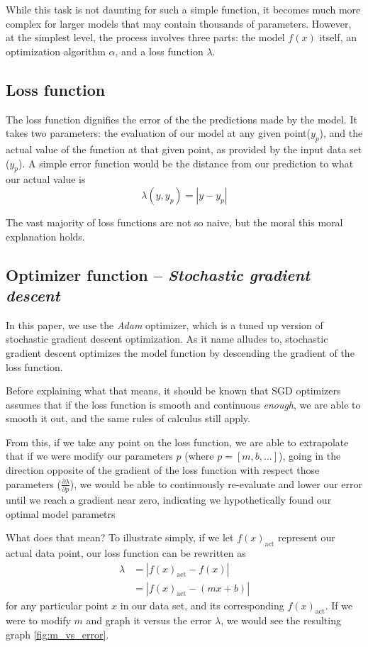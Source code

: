 \documentclass[titlepage,letterpaper]{article}
\begin{document}
While this task is not daunting for such a simple function, it becomes much more complex for larger models that may contain thousands of parameters. However, at the simplest level, the process involves three parts: the model $f(x)$ itself, an optimization algorithm $\alpha$,  and a loss function $\lambda$.


\subsection{Loss function}

The loss function dignifies the error of the the predictions made by the model. It takes two parameters: the evaluation of our model at any given point($y_p$), and the actual value of the function at that given point, as provided by the input data set ($y_p$). A simple error function would be the distance from our prediction to what our actual value is
\[\lambda(y,y_p) =  |y - y_p| \]

The vast majority of loss functions are not so naive, but the moral this moral explanation holds.


\subsection{Optimizer function -- \textit{Stochastic gradient descent}}

In this paper, we use the \textit{Adam} optimizer, which is a tuned up version of stochastic gradient descent optimization. As it name alludes to, stochastic gradient descent optimizes the model function by descending the gradient of the loss function. 

Before explaining what that means, it should be known that SGD optimizers assumes  that if the loss function is smooth and continuous \textit{enough}, we are able to smooth it out, and the same rules of calculus still apply.

From this, if we take any point on the loss function, we are able to extrapolate that if we were modify our parameters \(p\) (where $p = [m, b,...]$), going in the direction opposite of the gradient of the loss function with respect those parameters ($\frac{\partial\lambda}{\partial p}$), we would be able to continuously re-evaluate and lower our error until we reach a gradient near zero, indicating we hypothetically found our optimal model parametrs

What does that mean? To illustrate simply, if we let $f(x)_{\text{act}}$ represent our actual data point, our loss function can be rewritten as 
\begin{align}
\lambda &=  |f(x)_{\text{act}} - f(x)| \nonumber\\
&= | f(x)_{\text{act}} -  (mx + b)\label{eq1}|
\end{align}
for any particular point $x$ in our data set, and its corresponding $f(x)_{\text{act}}$. If we were to modify  $m$  and graph it versus the error $\lambda$, we would see the resulting graph \cref{fig:m_vs_error}. 
\end{document}
